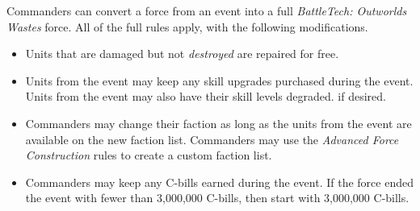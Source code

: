 Commanders can convert a force from an event into a full \emph{BattleTech: Outworlds Wastes} force.
All of the full  rules apply, with the following modifications.

\begin{itemize}

\item Units that are damaged but not \emph{destroyed} are repaired for free.

\item Units from the event may keep any skill upgrades purchased during the event.
Units from the event may also have their skill levels degraded. if desired.

\item Commanders may change their faction as long as the units from the event are available on the new faction list.
Commanders may use the \emph{Advanced Force Construction} rules to create a custom faction list.

\item Commanders may keep any C-bills earned during the event.
If the force ended the event with fewer than 3,000,000 C-bills, then start with 3,000,000 C-bills.

\end{itemize}
